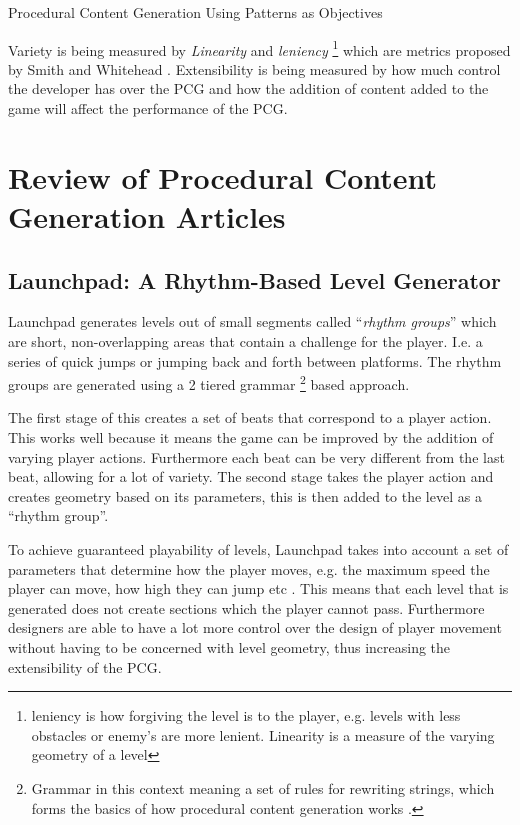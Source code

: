 \documentclass{scrartcl}
\begin{document}
Procedural Content Generation Using Patterns as Objectives \cite{dahlskog2014} \par

Variety is being measured by \textit{Linearity} and \textit{leniency} \footnote{leniency is how forgiving the level is to the player, e.g. levels with less obstacles or enemy's are more lenient. Linearity is a measure of the varying geometry of a level} which are metrics proposed by Smith and Whitehead \cite{smith2010}. Extensibility is being measured by how much control the developer has over the PCG and how the addition of content added to the game will affect the performance of the PCG.


\section{Review of Procedural Content Generation Articles}

\subsection{Launchpad: A Rhythm-Based Level Generator}

Launchpad generates levels out of small segments called ``\textit{rhythm groups}''  which are short, non-overlapping areas that contain a challenge for the player. I.e. a series of quick jumps or jumping back and forth between platforms. The rhythm groups are generated using a 2 tiered grammar \footnote{Grammar in this context meaning a set of rules for rewriting strings, which forms the basics of how procedural content generation works \cite{shaker2015}.} based approach.

The first stage of this creates a set of beats that correspond to a player action. This works well because it means the game can be improved by the addition of varying player actions. Furthermore each beat can be very different from the last beat, allowing for a lot of variety.
The second stage takes the player action and creates geometry based on its parameters, this is then added to the level as a ``rhythm group''. 

To achieve guaranteed playability of levels, Launchpad takes into account a set of parameters that determine how the player moves, e.g. the maximum speed the player can move, how high they can jump etc \cite{smith2012web}. This means that each level that is generated does not create sections which the player cannot pass. Furthermore designers are able to have a lot more control over the design of player movement without having to be concerned with level geometry, thus increasing the extensibility of the PCG.
\end{document}
